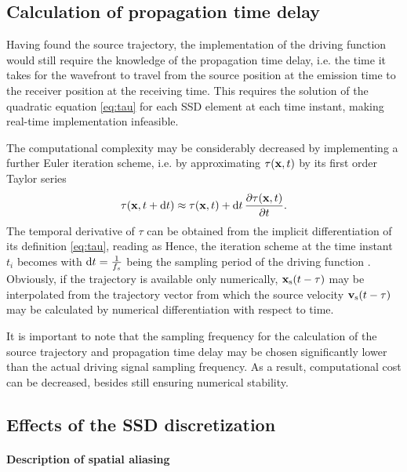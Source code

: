 \subsection{Calculation of propagation time delay}
	
Having found the source trajectory, the implementation of the driving function would still require the knowledge of the propagation time delay, i.e. the time it takes for the wavefront to travel from the source position at the emission time to the receiver position at the receiving time.
This requires the solution of the quadratic equation \eqref{eq:tau} for each SSD element at each time instant, making real-time implementation infeasible.

The computational complexity may be considerably decreased by implementing a further Euler iteration scheme, i.e. by approximating $\tau(\mathbf{x},t)$ by its first order Taylor series
\begin{equation}
\tau(\mathbf{x},t+\mathrm{d} t) \approx \tau(\mathbf{x},t) + \mathrm{d} t \, \frac{\partial \tau(\mathbf{x},t)}{\partial t}.
\end{equation}
The temporal derivative of $\tau$ can be obtained from the implicit differentiation of its definition \eqref{eq:tau}, reading as
Hence, the iteration scheme at the time instant $t_i$ becomes
with $\mathrm{d} t = \frac{1}{f_s}$ being the sampling period of the driving function \cite{doi:10.1121/1.4996126}.
Obviously, if the trajectory is available only numerically, $\mathbf{x}_{\mathrm{s}}(t-\tau)$ may be interpolated from the trajectory vector from which the source velocity $\mathbf{v}_{\mathrm{s}}(t-\tau)$ may be calculated by numerical differentiation with respect to time.

It is important to note that the sampling frequency for the calculation of the source trajectory and propagation time delay may be chosen significantly lower than the actual driving signal sampling frequency.
As a result, computational cost can be decreased, besides still ensuring numerical stability.

\subsection{Effects of the SSD discretization}

\paragraph{Description of spatial aliasing}

